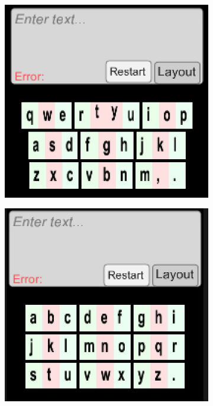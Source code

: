 \begin{figure}
\begin{subfigure}{.24\textwidth}
  \centering
  \includegraphics[width=.8\linewidth]{figures/F8-1.png}
  \caption{}
  \label{fig:f8a}
\end{subfigure}%
\begin{subfigure}{.24\textwidth}
  \centering
  \includegraphics[width=.8\linewidth]{figures/F8-2.png}
  \caption{}
  \label{fig:f8b}
\end{subfigure}
\begin{subfigure}{.24\textwidth}
  \centering

\end{subfigure}
\end{figure}
